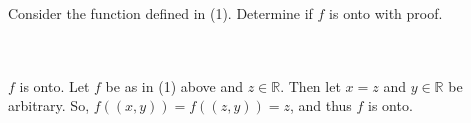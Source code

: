 Consider the function defined in (1). Determine if $f$ is onto with proof.\\\\

\begin{solution}\renewcommand{\qedsymbol}{}\ \\
    $f$ is onto. Let $f$ be as in (1) above and $z\in\mathbb{R}$. Then let $x=z$ and $y\in\mathbb{R}$ be
    arbitrary. So, $f((x,y))=f((z,y))=z$, and thus $f$ is onto.

\end{solution}